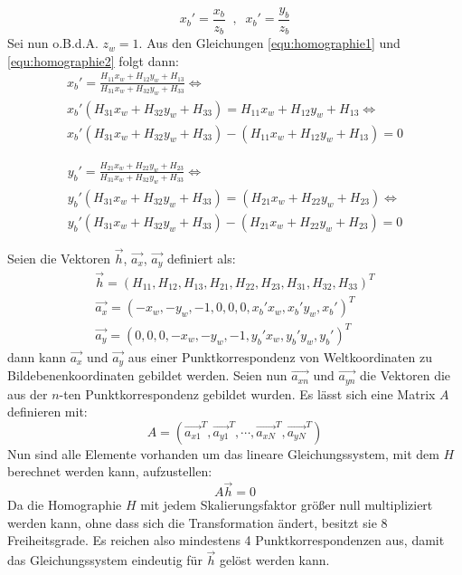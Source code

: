 \begin{equation}
\label{equ:homographie2}
	x_b\prime = \frac{x_b}{z_b} \;\;,\;\; x_b\prime = \frac{y_b}{z_b}
\end{equation} 
Sei nun o.B.d.A. \(z_w = 1\). Aus den Gleichungen \ref{equ:homographie1} und \ref{equ:homographie2} folgt dann:
\begin{gather}
\label{equ:homographie3}
	x_b\prime = \frac{H_{11}x_w + H_{12}y_w + H_{13}}{H_{31}x_w + H_{32}y_w + H_{33}} \Leftrightarrow \\
	x_b\prime \left( H_{31}x_w + H_{32}y_w + H_{33} \right) = H_{11}x_w + H_{12}y_w + H_{13}\Leftrightarrow \\
	x_b\prime \left( H_{31}x_w + H_{32}y_w + H_{33}\right) - \left( H_{11}x_w + H_{12}y_w + H_{13} \right) = 0
\end{gather}

\begin{gather}
\label{equ:homographie4}
	y_b\prime = \frac{H_{21}x_w + H_{22}y_w + H_{23}}{H_{31}x_w + H_{32}y_w + H_{33}} \Leftrightarrow \\
	y_b\prime \left(H_{31}x_w + H_{32}y_w + H_{33}\right) = \left( H_{21}x_w + H_{22}y_w + H_{23}\right)\Leftrightarrow \\
	y_b\prime  \left( H_{31}x_w + H_{32}y_w + H_{33} \right) - \left( H_{21}x_w + H_{22}y_w + H_{23} \right) = 0
\end{gather}

Seien die Vektoren \(\vec{h}\), \(\vec{a_x}\), \(\vec{a_y}\) definiert als:
\begin{gather}
	\vec{h} = \left( H_{11}, H_{12}, H_{13}, H_{21}, H_{22}, H_{23}, H_{31}, H_{32}, H_{33} \right)^{T} \\
	\vec{a_x} = \left( -x_w, -y_w, -1, 0, 0, 0, x_b\prime x_w, x_b\prime y_w, x_b\prime \right)^{T} \\
	\vec{a_y} = \left( 0, 0, 0, -x_w, -y_w, -1, y_b\prime x_w, y_b\prime y_w, y_b\prime \right)^{T}
\end{gather} 
dann kann \(\vec{a_{x}}\) und \(\vec{a_{y}}\) aus einer Punktkorrespondenz von Weltkoordinaten zu Bildebenenkoordinaten gebildet werden. Seien nun \(\vec{a_{xn}}\) und \(\vec{a_{yn}}\) die Vektoren die aus der \(n\)-ten Punktkorrespondenz gebildet wurden. Es lässt sich eine Matrix \(A\) definieren mit:
\begin{equation}
	A = \left( \vec{a_{x1}}^{T}, \vec{a_{y1}}^{T}, \cdots , \vec{a_{xN}}^{T}, \vec{a_{yN}}^{T} \right)
\end{equation}
Nun sind alle Elemente  vorhanden um das lineare Gleichungssystem, mit dem \(H\) berechnet  werden kann, aufzustellen:
\begin{equation}
	A\vec{h} = 0
\end{equation}
Da die Homographie \(H\) mit jedem Skalierungsfaktor größer null multipliziert werden kann, ohne dass sich die Transformation ändert, besitzt sie 8 Freiheitsgrade. Es reichen also mindestens 4 Punktkorrespondenzen aus, damit das Gleichungssystem eindeutig für \(\vec{h}\) gelöst werden kann. 

